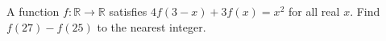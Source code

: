 A function $f:\mathbb R\to\mathbb R$ satisfies $4f(3-x)+3f(x)=x^2$ for all real $x$. Find $f(27)-f(25)$ to the nearest integer.
